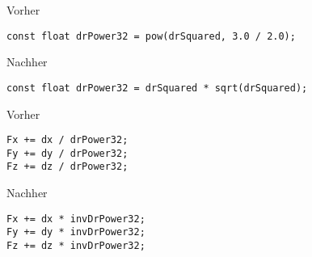 \documentclass{article}
\begin{document}
Vorher
\begin{verbatim}
const float drPower32 = pow(drSquared, 3.0 / 2.0);
\end{verbatim}

Nachher
\begin{verbatim}
const float drPower32 = drSquared * sqrt(drSquared);
\end{verbatim}

Vorher
\begin{verbatim}
Fx += dx / drPower32;
Fy += dy / drPower32;
Fz += dz / drPower32;
\end{verbatim}

Nachher
\begin{verbatim}
Fx += dx * invDrPower32;
Fy += dy * invDrPower32;
Fz += dz * invDrPower32;
\end{verbatim}
\end{document}
